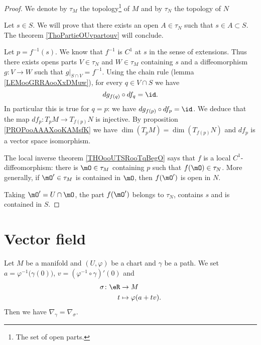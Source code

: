 \begin{proof}
	We denote by \( \tau_M\) the topology\footnote{The set of open parts.} of \( M\) and by \( \tau_N\) the topology of $N$

	Let \( s\in S\). We will prove that there exists an open \( A\in \tau_N\) such that \( s\in A\subset S\). The theorem \ref{ThoPartieOUvpartouv} will conclude.

	Let \( p=f^{-1}(s)\). We know that \( f^{-1}\) is \( C^1\) at \( s\) in the sense of extensions. Thus there exists opens parts \( V\in\tau_N\) and \( W\in\tau_M\) containing \( s\) and a diffeomorphism \(g \colon V\to W  \) such that \( g|_{S\cap V}=f^{-1}\). Using the chain rule (lemma \ref{LEMooGRRAooXxDMuw}), for every \( q\in V\cap S\) we have
	\begin{equation}
		dg_{f(q)}\circ df_q=\id.
	\end{equation}
	In particular this is true for \( q=p\): we have \( dg_{f(p)}\circ df_p=\id\). We deduce that the map \(df_p \colon T_pM\to T_{f(p)}N  \) is injective. By proposition \ref{PROPooAAAXooKAMsfK} we have \( \dim(T_pM)=\dim(T_{f(p)}N)\) and \( df_p\) is a vector space isomorphism.

	The local inverse theorem \ref{THOooUTSRooTqBegO} says that \( f\) is a local \( C^1\)-diffeomorphism: there is \( \mO\in\tau_M\) containing \( p\) such that \( f(\mO)\in\tau_N\). More generally, if \( \mO'\in \tau_M\) is contained in \( \mO\), then \( f(\mO')\) is open in \( N\).

	Taking \( \mO'=U\cap\mO\), the part \( f(\mO')\) belongs to \( \tau_N\), contains \( s\) and is contained in \( S\).
\end{proof}

\section{Vector field}

\begin{lemma}       \label{LEMooXFNQooXwCMNB}
	Let \( M\) be a manifold and \( (U,\varphi)\) be a chart and \( \gamma\) be a path. We set \( a=\varphi^{-1}\big( \gamma(0) \big)\), \(v= (\varphi^{-1}\circ\gamma)'(0)\) and
	\begin{equation}
		\begin{aligned}
			\sigma\colon \eR & \to M                  \\
			t                & \mapsto \varphi(a+tv).
		\end{aligned}
	\end{equation}
	Then we have \( \nabla_{\gamma}=\nabla_{\sigma}\).
\end{lemma}

